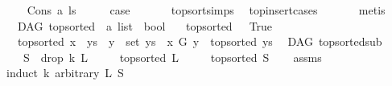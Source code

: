 \begin{isabellebody}
\ \ \isamarkupfalse%
\ {\isacharparenleft}{\kern0pt}Cons\ a\ ls{\isacharparenright}{\kern0pt}\isanewline
\ \ \isamarkupfalse%
\ \isamarkupfalse%
\ {\isacharquery}{\kern0pt}case\ \isanewline
\ \ \ \ \isamarkupfalse%
\ top{\isacharunderscore}{\kern0pt}sort{\isachardot}{\kern0pt}simps\ \isamarkupfalse%
\ top{\isacharunderscore}{\kern0pt}insert{\isacharunderscore}{\kern0pt}cases\ \isanewline
\ \ \ \ \isamarkupfalse%
\ metis\ \isanewline
{}\isamarkupfalse%
%
\endisatagproof
{\isafoldproof}%
%
\isadelimproof
\isanewline
%
\endisadelimproof
\isanewline
{}\isamarkupfalse%
\ {\isacharparenleft}{\kern0pt}\ DAG{\isacharparenright}{\kern0pt}\ top{\isacharunderscore}{\kern0pt}sorted\ {\isacharcolon}{\kern0pt}{\isacharcolon}{\kern0pt}\ {\isachardoublequoteopen}{\isacharprime}{\kern0pt}a\ list\ {\isasymRightarrow}\ bool{\isachardoublequoteclose}\ \isanewline
\ \ {\isachardoublequoteopen}top{\isacharunderscore}{\kern0pt}sorted\ {\isacharbrackleft}{\kern0pt}{\isacharbrackright}{\kern0pt}\ {\isacharequal}{\kern0pt}\ True{\isachardoublequoteclose}\ {\isacharbar}{\kern0pt}\isanewline
\ \ {\isachardoublequoteopen}top{\isacharunderscore}{\kern0pt}sorted\ {\isacharparenleft}{\kern0pt}x\ {\isacharhash}{\kern0pt}\ ys{\isacharparenright}{\kern0pt}\ {\isacharequal}{\kern0pt}\ {\isacharparenleft}{\kern0pt}{\isacharparenleft}{\kern0pt}{\isasymforall}y\ {\isasymin}\ set\ ys{\isachardot}{\kern0pt}\ {\isasymnot}\ x\ {\isasymrightarrow}\isactrlsup {\isacharplus}{\kern0pt}\isactrlbsub G\isactrlesub \ y{\isacharparenright}{\kern0pt}\ {\isasymand}\ top{\isacharunderscore}{\kern0pt}sorted\ ys{\isacharparenright}{\kern0pt}{\isachardoublequoteclose}\isanewline
\isanewline
{}\isamarkupfalse%
\ {\isacharparenleft}{\kern0pt}\ DAG{\isacharparenright}{\kern0pt}\ top{\isacharunderscore}{\kern0pt}sorted{\isacharunderscore}{\kern0pt}sub{\isacharcolon}{\kern0pt}\isanewline
\ \ \ {\isachardoublequoteopen}S\ {\isacharequal}{\kern0pt}\ drop\ k\ L{\isachardoublequoteclose}\isanewline
\ \ \ \ \ {\isachardoublequoteopen}top{\isacharunderscore}{\kern0pt}sorted\ L{\isachardoublequoteclose}\ \ \isanewline
\ \ \ {\isachardoublequoteopen}top{\isacharunderscore}{\kern0pt}sorted\ S{\isachardoublequoteclose}\isanewline
%
\isadelimproof
\ \ %
\endisadelimproof
%
\isatagproof
{}\isamarkupfalse%
\ assms\isanewline
{}\isamarkupfalse%
{\isacharparenleft}{\kern0pt}induct\ k\ arbitrary{\isacharcolon}{\kern0pt}\ L\ S{\isacharparenright}{\kern0pt}\isanewline

\end{isabellebody}
